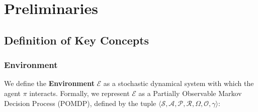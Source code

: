 \section{Preliminaries} \label{sec:prelimi}
\subsection{Definition of Key Concepts}

% 

\subsubsection{Environment}
We define the \textbf{Environment} $\mathcal{E}$ as a stochastic dynamical system with which the agent $\pi$ interacts. Formally, we represent $\mathcal{E}$ as a Partially Observable Markov Decision Process (POMDP), defined by the tuple $\langle \mathcal{S}, \mathcal{A}, \mathcal{P}, \mathcal{R}, \Omega, \mathcal{O}, \gamma \rangle$:

